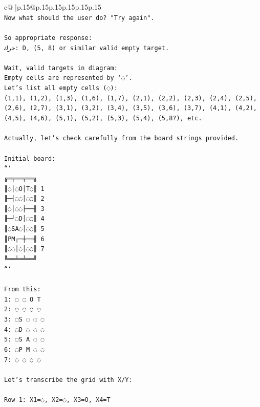 \documentclass{article}
\begin{document}
{\begin{supertabular}{c@{$\;$}|p{.15\linewidth}@{}p{.15\linewidth}p{.15\linewidth}p{.15\linewidth}p{.15\linewidth}p{.15\linewidth}}
{{{\\ 
\texttt{Now what should the user do? "Try again".} \\
\\ 
\texttt{So appropriate response:} \\
\texttt{حرك: D, (5, 8) or similar valid empty target.} \\
\\ 
\texttt{Wait, valid targets in diagram:} \\
\texttt{Empty cells are represented by '◌'.} \\
\texttt{Let's list all empty cells (◌):} \\
\texttt{(1,1), (1,2), (1,3), (1,6), (1,7), (2,1), (2,2), (2,3), (2,4), (2,5), (2,6), (2,7), (3,1), (3,2), (3,4), (3,5), (3,6), (3,7), (4,1), (4,2), (4,5), (4,6), (5,1), (5,2), (5,3), (5,4), (5,8?), etc.} \\
\\ 
\texttt{Actually, let's check carefully from the board strings provided.} \\
\\ 
\texttt{Initial board:} \\
\texttt{```} \\
\texttt{╔═╤══╤══╗} \\
\texttt{║◌│◌O│T◌║ 1} \\
\texttt{╟─┤◌◌│◌◌║ 2} \\
\texttt{║◌│◌◌├──╢ 3} \\
\texttt{╟─┘◌D│◌◌║ 4} \\
\texttt{║◌SA◌│◌◌║ 5} \\
\texttt{║PM┌─┼──╢ 6} \\
\texttt{║◌◌│◌│◌◌║ 7} \\
\texttt{╚══╧═╧══╝} \\
\texttt{```} \\
\\ 
\texttt{From this:} \\
\texttt{1: ◌ ◌ O T} \\
\texttt{2: ◌ ◌ ◌ ◌} \\
\texttt{3: ◌S ◌ ◌ ◌} \\
\texttt{4: ◌D ◌ ◌ ◌} \\
\texttt{5: ◌S A ◌ ◌} \\
\texttt{6: ◌P M ◌ ◌} \\
\texttt{7: ◌ ◌ ◌ ◌} \\
\\ 
\texttt{Let's transcribe the grid with X/Y:} \\
\\ 
\texttt{Row 1: X1=◌, X2=◌, X3=O, X4=T} \\
}}}
\end{supertabular}}
\end{document}

